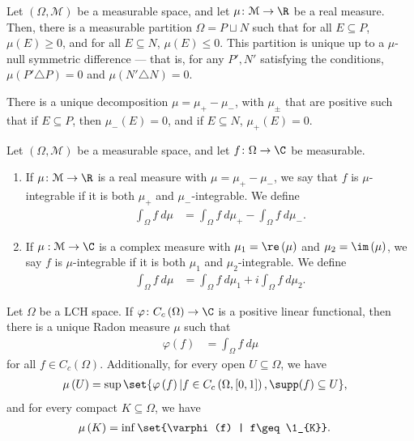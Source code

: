 \begin{theorem}
  Let $\left(\Omega,\mathcal{M}\right)$ be a measurable space, and let $\mu\colon \mathcal{M}\rightarrow \R$ be a real measure. Then, there is a measurable partition $\Omega = P\sqcup N$ such that for all $E\subseteq P$, $\mu(E) \geq 0$, and for all $E\subseteq N$, $\mu(E) \leq 0$. This partition is unique up to a $\mu$-null symmetric difference --- that is, for any $P',N'$ satisfying the conditions, $\mu\left(P'\triangle P\right) = 0$ and $\mu\left(N'\triangle N\right) = 0$.\newline

  There is a unique decomposition $\mu = \mu_{+} - \mu_{-}$, with $\mu_{\pm}$ that are positive such that if $E\subseteq P$, then $\mu_{-}\left(E\right) = 0$, and if $E\subseteq N$, $\mu_{+}\left(E\right) = 0$.
\end{theorem}
\begin{definition}
  Let $\left(\Omega,\mathcal{M}\right)$ be a measurable space, and let $f\colon \Omega\rightarrow \C$ be measurable.
  \begin{enumerate}[(1)]
    \item If $\mu\colon \mathcal{M}\rightarrow \R$ is a real measure with $\mu = \mu_{+} - \mu_{-}$, we say that $f$ is $\mu$-integrable if it is both $\mu_{+}$ and $\mu_{-}$-integrable. We define
      \begin{align*}
        \int_{\Omega}^{} f\:d\mu &= \int_{\Omega}^{} f\:d\mu_{+} - \int_{\Omega}^{} f\:d\mu_{-}.
      \end{align*}
    \item If $\mu:\mathcal{M}\rightarrow \C$ is a complex measure with $\mu_{1} = \re\left(\mu\right)$ and $\mu_{2} = \im\left(\mu\right)$, we say $f$ is $\mu$-integrable if it is both $\mu_{1}$ and $\mu_{2}$-integrable. We define
      \begin{align*}
        \int_{\Omega}^{} f\:d\mu &= \int_{\Omega}^{} f\:d\mu_{1} + i\int_{\Omega}^{} f\:d\mu_{2}.
      \end{align*}
  \end{enumerate}
\end{definition}
\begin{theorem}
  Let $\Omega$ be a LCH space. If $\varphi\colon C_{c}\left(\Omega\right)\rightarrow \C$ is a positive linear functional, then there is a unique Radon measure $\mu$ such that
  \begin{align*}
    \varphi\left(f\right) &= \int_{\Omega}^{} f\:d\mu
  \end{align*}
  for all $f\in C_c\left(\Omega\right)$. Additionally, for every open $U\subseteq \Omega$, we have
  \begin{align*}
    \mu\left(U\right) &= \sup\set{\varphi\left(f\right) | f\in C_c\left(\Omega,[0,1]\right),\supp(f) \subseteq U},
  \end{align*}
  and for every compact $K\subseteq \Omega$, we have
  \begin{align*}
    \mu\left(K\right) &= \inf\set{\varphi(f) | f\geq \1_{K}}.
  \end{align*}
\end{theorem}
